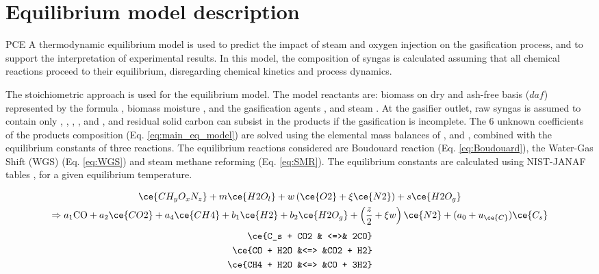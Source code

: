 
\section{Equilibrium model description}
\label{sec:eqmodel}

\gls{PCE} \ie A thermodynamic equilibrium model is used to predict the impact of steam and oxygen injection on the gasification process, and to support the interpretation of experimental results. In this model, the composition of syngas is calculated assuming that all chemical reactions proceed to their equilibrium, disregarding chemical kinetics and process dynamics.  \cite{Evans2012} \citet{Evans2012}

The stoichiometric approach is used for the equilibrium model. The model reactants are: biomass on dry and ash-free basis ($\mathit{daf}$) represented by the formula , biomass moisture , and the gasification agents ,  and steam . At the gasifier outlet, raw syngas is assumed to contain only , ,  , ,  and , and residual solid carbon  can subsist in the products if the gasification is incomplete. The 6 unknown coefficients of the products composition (Eq. \ref{eq:main_eq_model}) are solved using the elemental mass balances of ,  and , combined with the equilibrium constants of three reactions. The equilibrium reactions considered are Boudouard reaction (Eq. \ref{eq:Boudouard}), the Water-Gas Shift (WGS) (Eq. \ref{eq:WGS}) and steam methane reforming (Eq. \ref{eq:SMR}). The equilibrium constants are calculated using NIST-JANAF tables \cite{Chase1998}, for a given equilibrium temperature.

\begin{multline}
\label{eq:main_eq_model} \ce{CH_yO_xN_z} + m \ce{H2O_l} + w\left(\ce{O2} + \xi\ce{N2}\right) + s \ce{H2O_g} \\
\Rightarrow a_1\mathrm{CO} + a_2\ce{CO2} + a_4\ce{CH4} + b_1\ce{H2} + b_2\ce{H2O_g} + \left(\frac{z}{2}+\xi w\right)\ce{N2} + (a_0+u_{\ce{C}})\ce{C_s}
\end{multline}
\begin{eqnarray}
\label{eq:Boudouard}\ce{C_s + CO2 & <=>& 2CO}\\
\label{eq:WGS}\ce{CO + H2O &<=> &CO2 + H2}\\
\label{eq:SMR}\ce{CH4 + H2O &<=> &CO + 3H2}
\end{eqnarray}

